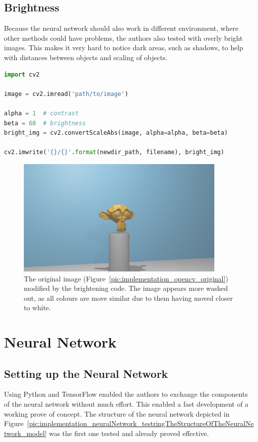 \subsection{Brightness}
Because the neural network should also work in different environment, where other methods could have problems, the authors also tested with overly bright images. This makes it very hard to notice dark areas, such as shadows, to help with distances between objects and scaling of objects.

\begin{lstlisting}[language=python]
import cv2

image = cv2.imread('path/to/image')

alpha = 1  # contrast
beta = 60  # brightness
bright_img = cv2.convertScaleAbs(image, alpha=alpha, beta=beta)

cv2.imwrite('{}/{}'.format(newdir_path, filename), bright_img)
\end{lstlisting}

\begin{figure}[h!]
	\centering
	\includegraphics[width=4in]{img/implementation_opencv_brightness.jpg}
	\caption{The original image (Figure~\ref{pic:implementation_opencv_original}) modified by the brightening code. The image appears more washed out, as all colours are move similar due to them having moved closer to white.}
	\label{pic:implementation_opencv_brightness}
\end{figure}

\section{Neural Network}
\label{sec:implementation_neural_network}
\subsection{Setting up the Neural Network}
Using Python and TensorFlow enabled the authors to exchange the components of the neural network without much effort. This enabled a fast development of a working prove of concept. The structure of the neural network depicted in Figure~\ref{pic:implementation_neuralNetwork_testringTheStructureOfTheNeuralNetwork_model} was the first one tested and already proved effective.

